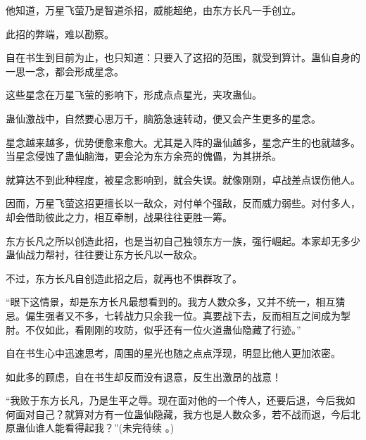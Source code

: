 \begin{this_body}
他知道，万星飞萤乃是智道杀招，威能超绝，由东方长凡一手创立。

此招的弊端，难以勘察。

自在书生到目前为止，也只知道：只要入了这招的范围，就受到算计。蛊仙自身的一思一念，都会形成星念。

这些星念在万星飞萤的影响下，形成点点星光，夹攻蛊仙。

蛊仙激战中，自然要心思万千，脑筋急速转动，便又会产生更多的星念。

星念越来越多，优势便愈来愈大。尤其是入阵的蛊仙越多，星念产生的也就越多。当星念侵蚀了蛊仙脑海，更会沦为东方余亮的傀儡，为其拼杀。

就算达不到此种程度，被星念影响到，就会失误。就像刚刚，卓战差点误伤他人。

因而，万星飞萤这招更擅长以一敌众，对付单个强敌，反而威力弱些。对付多人，却会借助彼此之力，相互牵制，战果往往更胜一筹。

东方长凡之所以创造此招，也是当初自己独领东方一族，强行崛起。本家却无多少蛊仙战力帮衬，往往要让东方长凡以一敌众。

不过，东方长凡自创造此招之后，就再也不惧群攻了。

“眼下这情景，却是东方长凡最想看到的。我方人数众多，又并不统一，相互猜忌。偏生强者又不多，七转战力只余我一位。真要战下去，反而相互之间成为掣肘。不仅如此，看刚刚的攻防，似乎还有一位火道蛊仙隐藏了行迹。”

自在书生心中迅速思考，周围的星光也随之点点浮现，明显比他人更加浓密。

如此多的顾虑，自在书生却反而没有退意，反生出激昂的战意！

“我败于东方长凡，乃是生平之辱。现在面对他的一个传人，还要后退，今后我如何面对自己？就算对方有一位蛊仙隐藏，我方也是人数众多，若不战而退，今后北原蛊仙谁人能看得起我？”(未完待续 。)

\end{this_body}

